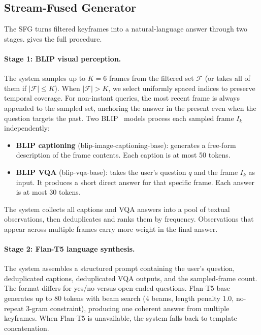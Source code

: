 \subsection{Stream-Fused Generator}
\label{sec:sfg}

The SFG turns filtered keyframes into a natural-language answer through two stages.  gives the full procedure.

\paragraph{Stage 1: BLIP visual perception.}
The system samples up to $K\!=\!6$ frames from the filtered set $\mathcal{F}$ (or takes all of them if $|\mathcal{F}| \le K$).
When $|\mathcal{F}| > K$, we select uniformly spaced indices to preserve temporal coverage.
For non-instant queries, the most recent frame is always appended to the sampled set, anchoring the answer in the present even when the question targets the past.
Two BLIP~\cite{li2022blip} models process each sampled frame $I_k$ independently:

\begin{itemize}[itemsep=2pt]
  \item \textbf{BLIP captioning} (blip-image-captioning-base): generates a free-form description of the frame contents. Each caption is at most 50 tokens.
  \item \textbf{BLIP VQA} (blip-vqa-base): takes the user's question $q$ and the frame $I_k$ as input. It produces a short direct answer for that specific frame. Each answer is at most 30 tokens.
\end{itemize}

The system collects all captions and VQA answers into a pool of textual observations, then deduplicates and ranks them by frequency. Observations that appear across multiple frames carry more weight in the final answer.

\paragraph{Stage 2: Flan-T5 language synthesis.}
The system assembles a structured prompt containing the user's question, deduplicated captions, deduplicated VQA outputs, and the sampled-frame count. The format differs for yes/no versus open-ended questions.
Flan-T5-base~\cite{chung2022flanT5} generates up to 80 tokens with beam search (4 beams, length penalty 1.0, no-repeat 3-gram constraint), producing one coherent answer from multiple keyframes.
When Flan-T5 is unavailable, the system falls back to template concatenation.

